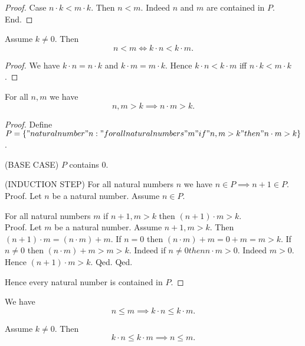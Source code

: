 \documentclass[../../natural-numbers.ftl.tex]{subfiles}
\begin{document}
\begin{forthel}
\begin{proof}
      Case $n \cdot k < m \cdot k$.
        Then $n < m$.
        Indeed $n$ and $m$ are contained in $P$.
      End.
    \end{proof}


    \begin{corollary}[NN 02 03 332119]
      Assume $k \neq 0$.
      Then
      $$n < m \iff k \cdot n < k \cdot m.$$
    \end{corollary}
    \begin{proof}
      We have $k \cdot n = n \cdot k$ and $k \cdot m = m \cdot k$.
      Hence $k \cdot n < k \cdot m$ iff $n \cdot k < m \cdot k$.
    \end{proof}


    \begin{proposition}[NN 02 03 319805]
      For all $n,m$ we have
      $$n,m > k \implies n \cdot m > k.$$
    \end{proposition}
    \begin{proof}
      Define $P = \{ "natural number" n : "for all natural numbers" m "if" n,m > k "then" n \cdot m > k \}$.

      (BASE CASE) $P$ contains $0$.

      (INDUCTION STEP) For all natural numbers $n$ we have $n \in P \implies n + 1 \in P$. \\
      Proof.
        Let $n$ be a natural number.
        Assume $n \in P$.

        For all natural numbers $m$ if $n + 1, m > k$ then $(n + 1) \cdot m > k$. \\
        Proof.
          Let $m$ be a natural number.
          Assume $n + 1, m > k$.
          Then $(n + 1) \cdot m = (n \cdot m) + m$.
          If $n = 0$ then $(n \cdot m) + m = 0 + m = m > k$.
          If $n \neq 0$ then $(n \cdot m) + m > m > k$.
          Indeed if $n \neq 0 then n \cdot m > 0$.
          Indeed $m > 0$.
          Hence $(n + 1) \cdot m > k$.
        Qed.
      Qed.

      Hence every natural number is contained in $P$.
    \end{proof}


    \begin{corollary}[NN 02 03 496763]
      We have
      $$n \leq m \implies k \cdot n \leq k \cdot m.$$
    \end{corollary}

    \begin{corollary}[NN 02 03 575338]
      Assume $k \neq 0$.
      Then
      $$k \cdot n \leq k \cdot m \implies n \leq m.$$
    \end{corollary}


\end{forthel}
\end{document}
